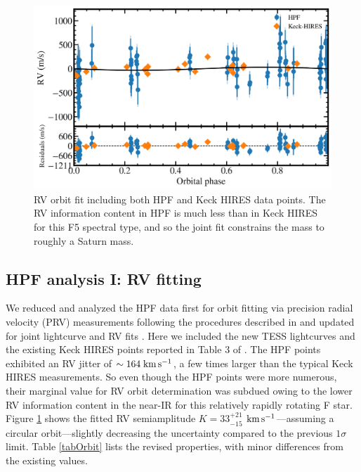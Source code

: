 \documentclass[twocolumn]{aastex631}
\newcommand{\kms}{\ensuremath{\rm km\,s^{-1}}}
\begin{document}
\begin{figure}
    \includegraphics[width=\linewidth]{figures/HAT-P-67b_rv.pdf}
    \caption{RV orbit fit including both HPF and Keck HIRES data points.  The RV information content in HPF is much less than in Keck HIRES for this F5 spectral type, and so the joint fit constrains the mass to roughly a Saturn mass.}
    \label{fig:RVfit}
\end{figure}

\subsection{HPF analysis I: RV fitting}\label{secRVfit}

We reduced and analyzed the HPF data first for orbit fitting via precision radial velocity (PRV) measurements following the procedures described in \citet{2021AJ....161..173T} and updated for joint lightcurve and RV fits \citep{2022AJ....163..225T}.  Here we included the new TESS lightcurves and the existing Keck HIRES points reported in Table 3 of \citet{2017AJ....153..211Z}.  The HPF points exhibited an RV jitter of $\sim164\;\kms$, a few times larger than the typical Keck HIRES measurements.  So even though the HPF points were more numerous, their marginal value for RV orbit determination was subdued owing to the lower RV information content in the near-IR for this relatively rapidly rotating F star.  Figure \ref{fig:RVfit} shows the fitted RV semiamplitude $K=33_{-15}^{+21}$ \kms---assuming a circular orbit---slightly decreasing the uncertainty compared to the previous $1\sigma$ limit.  Table \ref{tabOrbit} lists the revised properties, with minor differences from the existing values.
\end{document}
